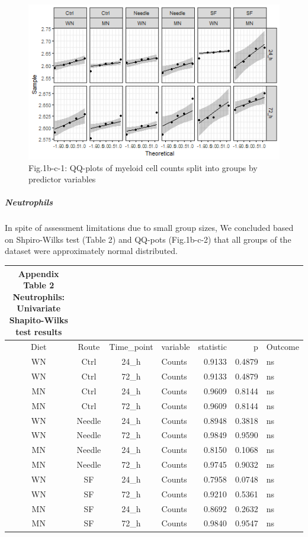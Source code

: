 \documentclass[
  12pt,
  letterpaper,
]{article}
\begin{document}
\begin{figure}[H]

{\centering \includegraphics[width=0.95\linewidth,]{Statistics_report_files/figure-latex/qq-plot-figure-1b-c-myeloid-cells-1} 

}

\caption{Fig.1b-c-1: QQ-plots of myeloid cell counts split into groups by predictor variables}\label{fig:qq-plot-figure-1b-c-myeloid-cells}
\end{figure}

\subparagraph{Neutrophils}\label{neutrophils}

In spite of assessment limitations due to small group sizes, We concluded based on Shpiro-Wilks test (Table 2) and QQ-pots (Fig.1b-c-2) that all groups of the dataset were approximately normal distributed.

\begin{longtable}{ccclrrl}
\caption*{
{\large \textbf{Appendix Table 2}} \\ 
{\small \textbf{Neutrophils: Univariate Shapito-Wilks test results}}
} \\ 
\toprule
Diet & Route & Time\_point & variable & statistic & p & Outcome \\ 
\midrule\addlinespace[2.5pt]
WN & Ctrl & 24\_h & Counts & 0.9133 & 0.4879 & ns \\ 
WN & Ctrl & 72\_h & Counts & 0.9133 & 0.4879 & ns \\ 
MN & Ctrl & 24\_h & Counts & 0.9609 & 0.8144 & ns \\ 
MN & Ctrl & 72\_h & Counts & 0.9609 & 0.8144 & ns \\ 
WN & Needle & 24\_h & Counts & 0.8948 & 0.3818 & ns \\ 
WN & Needle & 72\_h & Counts & 0.9849 & 0.9590 & ns \\ 
MN & Needle & 24\_h & Counts & 0.8150 & 0.1068 & ns \\ 
MN & Needle & 72\_h & Counts & 0.9745 & 0.9032 & ns \\ 
WN & SF & 24\_h & Counts & 0.7958 & 0.0748 & ns \\ 
WN & SF & 72\_h & Counts & 0.9210 & 0.5361 & ns \\ 
MN & SF & 24\_h & Counts & 0.8692 & 0.2632 & ns \\ 
MN & SF & 72\_h & Counts & 0.9840 & 0.9547 & ns \\ 
\bottomrule
\end{longtable}
\end{document}
